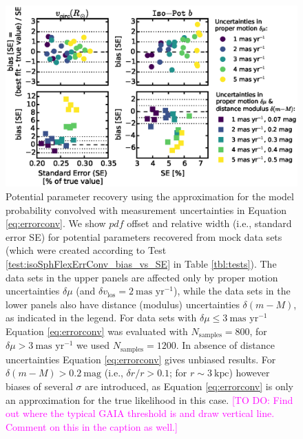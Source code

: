\documentclass[iop,revtex4]{emulateapj}
\newcommand{\pdf}{\ensuremath{pdf}}
\newcommand{\Wilma}[1]{\textcolor{Magenta}{#1}}
\begin{document}
\begin{figure}[!htbp]
\centering
\includegraphics[width=\columnwidth]{figs/isoSphFlexErrConv_bias_vs_SE.eps}
\caption{Potential parameter recovery using the approximation for the model probability convolved with measurement uncertainties in Equation \eqref{eq:errorconv}. We show  \pdf{} offset and relative width (i.e., standard error SE) for potential parameters recovered from mock data sets (which were created according to Test \ref{test:isoSphFlexErrConv_bias_vs_SE} in Table \ref{tbl:tests}). The data sets in the upper panels are affected only by proper motion uncertainties $\delta \mu$ (and $\delta v_\text{los}=2~\text{mas yr}^{-1}$), while the data sets in the lower panels also have distance (modulus) uncertainties $\delta (m-M)$, as indicated in the legend. For data sets with $\delta \mu \leq 3 ~\text{mas yr}^{-1}$ Equation \eqref{eq:errorconv} was evaluated with $N_\text{samples}=800$, for $\delta \mu > 3~\text{mas yr}^{-1}$ we used $N_\text{samples}=1200$. In absence of distance uncertainties Equation \eqref{eq:errorconv} gives unbiased results. For $\delta(m-M) > 0.2~\text{mag}$ (i.e., $\delta r/r > 0.1$; for $r \sim 3~\text{kpc}$) however biases of several $\sigma$ are introduced, as Equation \eqref{eq:errorconv} is only an approximation for the true likelihood in this case. \Wilma{[TO DO: Find out where the typical GAIA threshold is and draw vertical line. Comment on this in the caption as well.]}}
\label{fig:isoSphFlexErrConv_bias_vs_SE}
\end{figure}
\end{document}
